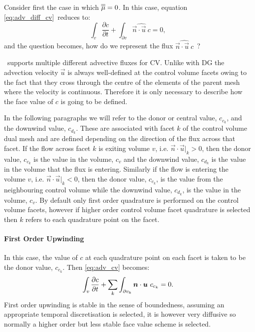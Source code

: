 Consider first the case in which $\overline{\overline{\mu}}=0$. In this case, equation \eqref{eq:adv_diff_cv}\ reduces to:
\begin{equation}\label{eq:adv_cv}
  \int_v \frac{\partial c}{\partial t} +
    \int_{\partial v} \widehat{\vec{n}\cdot\vec{u}~c}
    = 0,
\end{equation}
and the question becomes, how do we represent the flux $\widehat{\vec{n}\cdot\vec{u}~c}$\ ?

\fluidity\ supports multiple different advective fluxes for CV.  Unlike with DG the advection velocity $\vec{u}$ is always well-defined at the control volume facets owing to the fact that they cross through the centre of the elements of the parent mesh where the velocity is continuous.  Therefore it is only necessary to describe how the face value of $c$ is going to be defined.

In the following paragraphs we will refer to the donor or central value, $c_{c_k}$, and the downwind value, $c_{d_k}$.  These are associated with facet $k$ of the control volume dual mesh and are defined depending on the direction of the flux across that facet.  If the flow across facet $k$ is exiting volume $v$, i.e. $\vec{n}\cdot\vec{u}|_k>0$, then the donor value, $c_{c_k}$ is the value in the volume, $c_v$ and the downwind value, $c_{d_k}$ is the value in the volume that the flux is entering.  Similarly if the flow is entering the volume $v$, i.e. $\vec{n}\cdot\vec{u}|_k<0$, then the donor value, $c_{c_k}$, is the value from the neighbouring control volume while the downwind value, $c_{d_k}$, is the value in the volume, $c_v$.  By default only first order quadrature is performed on the control volume facets, however if higher order control volume facet quadrature is selected then $k$ refers to each quadrature point on the facet.

\paragraph{First Order Upwinding} \label{sec:cv_fou}

In this case, the value of $c$ at each quadrature point on each facet is taken to be the donor value, $c_{c_k}$.  Then \eqref{eq:adv_cv} becomes:
\begin{equation}
  \int_v \frac{\partial c}{\partial t} +
    \sum_k\int_{\partial v_k} {\mbox{\boldmath$n$}}\cdot{\mbox{\boldmath$u$}}~c_{c_k}
    = 0.
\end{equation}
First order upwinding is stable in the sense of boundedness, assuming an appropriate temporal discretisation is selected, it is however very diffusive so normally a higher order but less stable face value scheme is selected.

